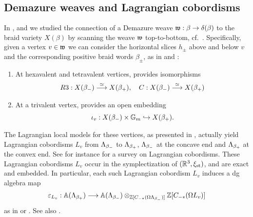 \subsection{Demazure weaves and Lagrangian cobordisms}\label{ssec:Lagrangian_coboridsms} In ,  and  we studied the connection of a Demazure weave $\mathfrak{w}:\beta\to\delta(\beta)$ to the braid variety $X(\beta)$ by scanning the weave $\mathfrak{w}$ top-to-bottom, cf.~. Specifically, given a vertex $v\in\mathfrak{w}$ we can consider the horizontal slices $h_\pm$ above and below $v$ and the corresponding positive braid words $\beta_{\pm}$, as in  and :
\begin{enumerate}
    \item At hexavalent and tetravalent vertices,  provides isomorphisms
    \begin{equation}\label{eq:cobordism_maps_braid_varieties}R3:X(\beta_-)\stackrel{\simeq}{\longrightarrow} X(\beta_+),\quad C:X(\beta_-)\stackrel{\simeq}{\longrightarrow} X(\beta_+)
    \end{equation}

    \item At a trivalent vertex,  provides an open embedding \begin{equation}\label{eq:cobordism_maps_braid_varieties2}
        \iota_v:X(\beta_-)\times\mathbb{G}_m\hookrightarrow X(\beta_+).
    \end{equation}
 \end{enumerate}

\noindent The Lagrangian local models for these vertices, as presented in , actually yield Lagrangian cobordisms $L_v$ from $\Lambda_{\beta_-}$ to $\Lambda_{\beta_+}$, $\Lambda_{\beta_-}$ at the concave end and $\Lambda_{\beta_+}$ at the convex end. See for instance \cite[Section 6]{EtnyreNg22_Survey} for a survey on Lagrangian cobordisms. These Lagrangian cobordisms $L_v$ occur in the symplectization of $(\mathbb{R}^3,\xi_{\text{st}})$, and are exact and embedded. In particular, each such Lagrangian cobordism $L_v$ induces a dg algebra map
\begin{equation}\label{eq:cobordism_map}
\varepsilon_{L_v}:\mathbb{A}(\Lambda_{\beta_+})\longrightarrow \mathbb{A}(\Lambda_{\beta_-})\otimes_{\mathbb{Z}[C_{-*}(\Omega \Lambda_{\beta_-})]} \mathbb{Z}[C_{-*}(\Omega L_v)]
\end{equation}
as in \cite[Theorem 1.6]{EHK} or \cite[Theorem 6.3]{EtnyreNg22_Survey}. See also \cite{LiCobordism1,li2024lagrangiancobordismfunctormicrolocal}.

